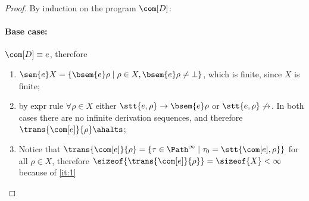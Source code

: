 \begin{proof}
  By induction on the program \(\com[D]\):
  \paragraph*{Base case:\\}
  \(\com[D] \equiv e\), therefore
  \begin{enumerate}[label=(\roman*).]
  \item \label{it:1}
    \(\sem{e}X = \{\bsem{e}\rho \mid \rho \in X , \bsem{e}\rho \neq
    \bot\}\), which is finite, since \(X\) is finite;
  \item \label{it:2} by expr rule \(\forall \rho \in X\) either
    \(\stt{e,\rho} \to \bsem{e}\rho\) or \(\stt{e,\rho} \not\to\). In
    both cases there are no infinite derivation sequences, and therefore
    \(\trans{\com[e]}{\rho} \ahalts\);
  \item Notice that
    \(\trans{\com[e]}{\rho} = \{\tau \in \Path^\infty \mid \tau_0 =
    \stt{\com[e], \rho}\}\) for all \(\rho \in X\), therefore
    \(\sizeof{\trans{\com[e]}{\rho}} = \sizeof{X} < \infty\) because
    of \ref{it:1}
  \end{enumerate}
  

\end{proof}
